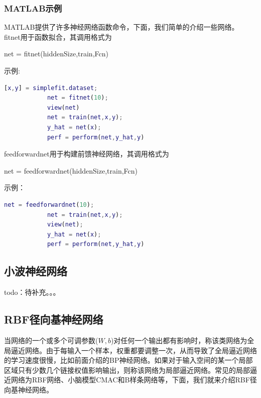 {        \subsubsection{MATLAB示例}
            \par
            MATLAB提供了许多神经网络函数命令，下面，我们简单的介绍一些网络。\\
            fitnet用于函数拟合，其调用格式为
            \par
            net = fitnet(hiddenSize,train,Fcn)
            \par
            示例:
            \begin{lstlisting}[language = Matlab]
            [x,y] = simplefit.dataset;
            net = fitnet(10);
            view(net)
            net = train(net,x,y);
            y_hat = net(x);
            perf = perform(net,y_hat,y)
            \end{lstlisting}
            feedforwardnet用于构建前馈神经网络，其调用格式为
            \par
            net = feedforwardnet(hiddenSize,train,Fcn)
            \par
            示例：
            \begin{lstlisting}[language = Matlab]
            net = feedforwardnet(10);
            net = train(net,x,y);
            view(net);
            y_hat = net(x);
            perf = perform(net,y_hat,y)
            \end{lstlisting}

    \subsection{小波神经网络}
        \par
        todo：待补充。。。
    \subsection{RBF径向基神经网络}
        \par
        当网络的一个或多个可调参数($W,b$)对任何一个输出都有影响时，称该类网络为全局逼近网络。由于每输入一个样本，权重都要调整一次，从而导致了全局逼近网络的学习速度很慢，比如前面介绍的BP神经网络。如果对于输入空间的某一个局部区域只有少数几个链接权值影响输出，则称该网络为局部逼近网络。常见的局部逼近网络为RBF网络、小脑模型CMAC和B样条网络等，下面，我们就来介绍RBF径向基神经网络。
}
